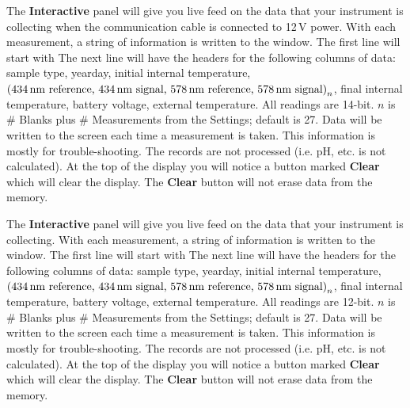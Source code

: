 The \textbf{Interactive} panel will give you live feed on the data that your instrument is collecting when the communication cable is connected to 12\,V power. With each measurement, a string of information is written to the window. The first line will start with  The next line will have the headers for the following columns of data: sample type, yearday, initial internal temperature, $\textrm{(434\,nm reference, 434\,nm signal, \linebreak 578\,nm reference, 578\,nm signal)}_n$, final internal temperature, battery voltage, external temperature. All readings are 14-bit. $n$ is \# Blanks plus \# Measurements from the Settings; default is 27. Data will be written to the screen each time a measurement is taken. This information is mostly for trouble-shooting. The records are not processed (i.e. pH, etc. is not calculated). At the top of the display you will notice a button marked \textbf{Clear} which will clear the display. The \textbf{Clear} button will not erase data from the memory.

\or			%

The \textbf{Interactive} panel will give you live feed on the data that your instrument is collecting. With each measurement, a string of information is written to the window. The first line will start with  The next line will have the headers for the following columns of data: sample type, yearday, initial internal temperature, $\textrm{(434\,nm reference, 434\,nm signal, \linebreak 578\,nm reference, 578\,nm signal)}_n$, final internal temperature, battery voltage, external temperature. All readings are 12-bit. $n$ is \# Blanks plus \# Measurements from the Settings; default is 27. Data will be written to the screen each time a measurement is taken. This information is mostly for trouble-shooting. The records are not processed (i.e. pH, etc. is not calculated). At the top of the display you will notice a button marked \textbf{Clear} which will clear the display. The \textbf{Clear} button will not erase data from the memory.

\fi

